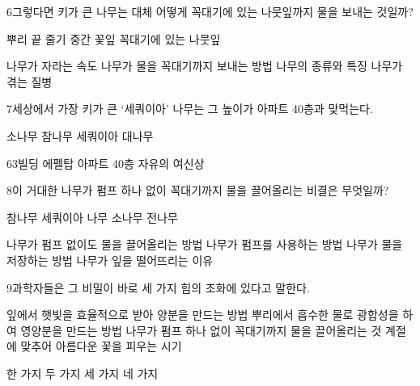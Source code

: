 \documentclass[fs85,seriesRus]{korfarm-base}
\begin{document}
\begin{kfSentenceUnit}{6}{그렇다면 키가 큰 나무는 대체 어떻게 꼭대기에 있는 나뭇잎까지 물을 보내는 것일까?}
\begin{kfChoices}
\kfChoice 뿌리 끝
\kfChoice 줄기 중간
\kfChoice 꽃잎
\kfChoice 꼭대기에 있는 나뭇잎
\end{kfChoices}
\begin{kfChoices}
\kfChoice 나무가 자라는 속도
\kfChoice 나무가 물을 꼭대기까지 보내는 방법
\kfChoice 나무의 종류와 특징
\kfChoice 나무가 겪는 질병
\end{kfChoices}
\end{kfSentenceUnit}

\begin{kfSentenceUnit}{7}{세상에서 가장 키가 큰 ‘세쿼이아’ 나무는 그 높이가 아파트 40층과 맞먹는다.}
\begin{kfChoices}
\kfChoice 소나무
\kfChoice 참나무
\kfChoice 세쿼이아
\kfChoice 대나무
\end{kfChoices}
\begin{kfChoices}
\kfChoice 63빌딩
\kfChoice 에펠탑
\kfChoice 아파트 40층
\kfChoice 자유의 여신상
\end{kfChoices}
\end{kfSentenceUnit}

\begin{kfSentenceUnit}{8}{이 거대한 나무가 펌프 하나 없이 꼭대기까지 물을 끌어올리는 비결은 무엇일까?}
\begin{kfChoices}
\kfChoice 참나무
\kfChoice 세쿼이아 나무
\kfChoice 소나무
\kfChoice 전나무
\end{kfChoices}
\begin{kfChoices}
\kfChoice 나무가 펌프 없이도 물을 끌어올리는 방법
\kfChoice 나무가 펌프를 사용하는 방법
\kfChoice 나무가 물을 저장하는 방법
\kfChoice 나무가 잎을 떨어뜨리는 이유
\end{kfChoices}
\end{kfSentenceUnit}

\begin{kfSentenceUnit}{9}{과학자들은 그 비밀이 바로 세 가지 힘의 조화에 있다고 말한다.}
\begin{kfChoices}
\kfChoice 잎에서 햇빛을 효율적으로 받아 양분을 만드는 방법
\kfChoice 뿌리에서 흡수한 물로 광합성을 하여 영양분을 만드는 방법
\kfChoice 나무가 펌프 하나 없이 꼭대기까지 물을 끌어올리는 것
\kfChoice 계절에 맞추어 아름다운 꽃을 피우는 시기
\end{kfChoices}
\begin{kfChoices}
\kfChoice 한 가지
\kfChoice 두 가지
\kfChoice 세 가지
\kfChoice 네 가지
\end{kfChoices}
\end{kfSentenceUnit}
\end{document}
